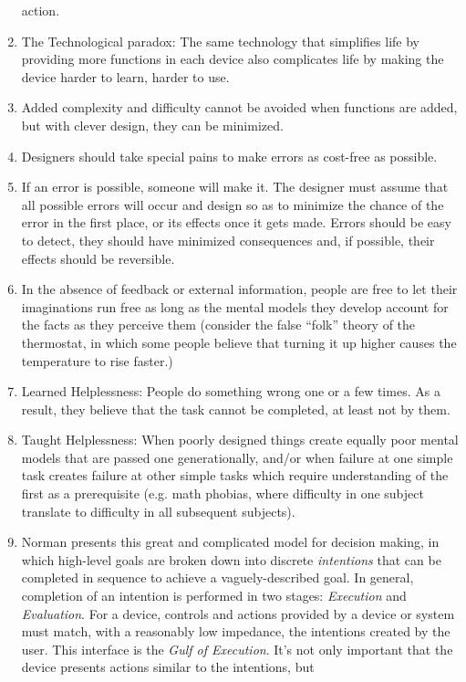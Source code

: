 \documentclass{designdoc}
\begin{document}
\begin{enumerate}
  action.
\item The Technological paradox: The same technology that simplifies life by
  providing more functions in each device also complicates life by making the
  device harder to learn, harder to use.
\item Added complexity and difficulty cannot be avoided when functions are
  added, but with clever design, they can be minimized.
\item Designers should take special pains to make errors as cost-free as
  possible.
\item If an error is possible, someone will make it. The designer must assume
  that all possible errors will occur and design so as to minimize the chance
  of the error in the first place, or its effects once it gets made. Errors
  should be easy to detect, they should have minimized consequences and, if
  possible, their effects should be reversible.
\item In the absence of feedback or external information, people are free to
  let their imaginations run free as long as the mental models they develop
  account for the facts as they perceive them (consider the false ``folk''
  theory of the thermostat, in which some people believe that turning it up
  higher causes the temperature to rise faster.)
\item Learned Helplessness: People do something wrong one or a few times. As a
  result, they believe that the task cannot be completed, at least not by them.
\item Taught Helplessness: When poorly designed things create equally poor
  mental models that are passed one generationally, and/or when failure at one
  simple task creates failure at other simple tasks which require understanding
  of the first as a prerequisite (e.g. math phobias, where difficulty in one
  subject translate to difficulty in all subsequent subjects).
\item Norman presents this great and complicated model for decision making, in
  which high-level goals are broken down into discrete \textit{intentions} that
  can be completed in sequence to achieve a vaguely-described goal. In general,
  completion of an intention is performed in two stages: \textit{Execution} and
  \textit{Evaluation}. For a device, controls and actions provided by a device
  or system must match, with a reasonably low impedance, the intentions created
  by the user. This interface is the \textit{Gulf of Execution}. It's not only
  important that the device presents actions similar to the intentions, but

\end{enumerate}
\end{document}
